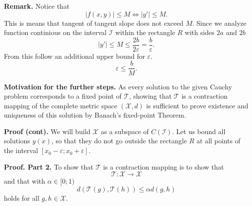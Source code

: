 \documentclass[10pt]{beamer}
\begin{document}
\begin{frame}
	\textbf{Remark.} Notice that
	\[|f(x, y)| \le M \Leftrightarrow |y'| \le M.\]
	This is means that tangent of tangent slope does not exceed \(M\). Since we analyze function
	continious on the interval \(\mathcal{I}\) within the rectangle \(R\) with sides \(2a\) and \(2b\)
	\[|y'| \le M \le \frac{2b}{2\varepsilon} = \frac{b}{\varepsilon}.\]
	From this follow an additional upper bound for \(\varepsilon\).
	\[\varepsilon \le \frac{b}{M}.\]
\end{frame}

\begin{frame}
	\textbf{Motivation for the further steps.} As every solution to the given Cauchy problem
	corresponds to a fixed point of \(\mathcal{T}\),
	showing that \(\mathcal{T}\) is a contraction mapping of the complete
	metric space \((\mathcal{X}, d)\) is sufficient to prove existence and uniqueness
	of this solution by Banach’s fixed-point Theorem.
	\vspace{0.3cm}

\end{frame}

\begin{frame}
	\textbf{Proof (cont).} We will build \(\mathcal{X}\) as a subspace of \(C(\mathcal{I})\).
	Let us bound all solutions \(y(x)\), so that they do not go outside the rectangle \(R\) at all points of the
	interval \([x_0 - \varepsilon; x_0 + \varepsilon]\).
	\onslide<2->{\[|y_0 - y(x)| = \left|\int_{x_0}^{x} f(t,y(t)) dt\right| \le |x_0 - x| \cdot |\max_{x \in \mathcal{I}}{f(x,y(x))}|
	\le \varepsilon M.\]}
	\onslide<3->{Then
	\[\mathcal{X} := \{y \in C(\mathcal{I}) : y(x_0) = y_0, \, \sup_{x \in \mathcal{I}}|y_0 - y(x)| \le \varepsilon M\}.\]}

\end{frame}

\begin{frame}
	\textbf{Proof. Part 2.} To show that \(\mathcal{T}\) is a contraction mapping is to show that
	\[\mathcal{T}: \mathcal{X} \rightarrow \mathcal{X}\] and that with \(\alpha \in [0;1)\)
	\[d(\mathcal{T}(g), \mathcal{T}(h)) \le \alpha d(g, h)\]
	holds for all \(g, h \in \mathcal{X}\).
\end{frame}
\end{document}

